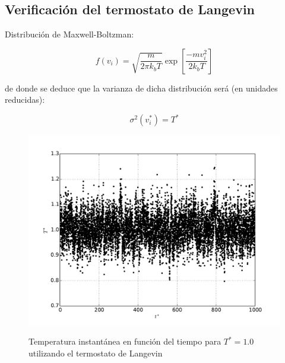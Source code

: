 \documentclass[a4paper,12pt]{article}
\begin{document}
\subsection{Verificación del termostato de Langevin}

Distribución de Maxwell-Boltzman:

\begin{equation}
f (v_i) =
\sqrt{\frac{m}{2 \pi k_bT}} \exp \left[ \frac{-mv_i^2}{2k_bT} \right]
\end{equation}

\noindent de donde se deduce que la varianza de dicha distribución será (en unidades reducidas):

\begin{equation}
\sigma^2(v^*_i) = T^*
\end{equation}

\begin{figure}[H]
	\centering
	\includegraphics[scale=0.6]{termo_tempe.pdf} \\
	\caption{Temperatura instantánea en función del tiempo para $T^*=1.0$ utilizando el termostato de Langevin}\label{fig:termo_tempe}
\end{figure}
\end{document}
